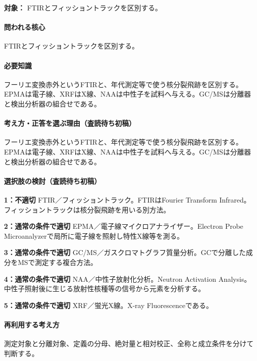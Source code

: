 \noindent\textbf{対象：} FTIRとフィッショントラックを区別する。\par

\paragraph{問われる核心} FTIRとフィッショントラックを区別する。

\paragraph{必要知識} フーリエ変換赤外というFTIRと、年代測定等で使う核分裂飛跡を区別する。EPMAは電子線、XRFはX線、NAAは中性子を試料へ与える。GC/MSは分離器と検出分析器の組合せである。

\paragraph{考え方・正答を選ぶ理由（査読待ち初稿）} フーリエ変換赤外というFTIRと、年代測定等で使う核分裂飛跡を区別する。EPMAは電子線、XRFはX線、NAAは中性子を試料へ与える。GC/MSは分離器と検出分析器の組合せである。

\paragraph{選択肢の検討（査読待ち初稿）}\mbox{}\par

\noindent\textbf{1：不適切} FTIR／フィッショントラック。FTIRはFourier Transform Infrared。フィッショントラックは核分裂飛跡を用いる別方法。\par

\noindent\textbf{2：通常の条件で適切} EPMA／電子線マイクロアナライザー。Electron Probe Microanalyzerで局所に電子線を照射し特性X線等を測る。\par

\noindent\textbf{3：通常の条件で適切} GC/MS／ガスクロマトグラフ質量分析。GCで分離した成分をMSで測定する複合方法。\par

\noindent\textbf{4：通常の条件で適切} NAA／中性子放射化分析。Neutron Activation Analysis。中性子照射後に生じる放射性核種等の信号から元素を分析する。\par

\noindent\textbf{5：通常の条件で適切} XRF／蛍光X線。X-ray Fluorescenceである。\par

\paragraph{再利用する考え方} 測定対象と分離対象、定義の分母、絶対量と相対校正、全称と成立条件を分けて判断する。

